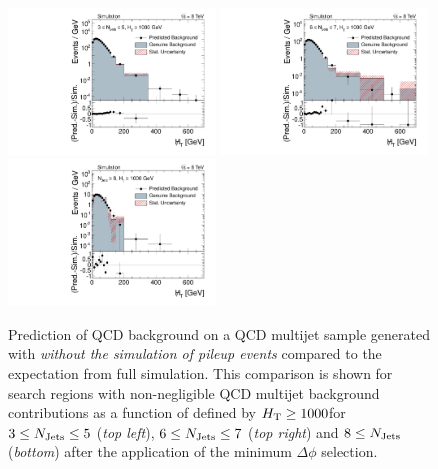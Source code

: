 \begin{figure}[!t]
  \centering

  \begin{minipage}[c]{1.\textwidth}
    \begin{center}
      \includegraphics[width=0.49\textwidth]{figures/MHT_JetBin2_HThigh_pythia_chsJets_pt0_NoPU_v1.pdf}%
      \includegraphics[width=0.49\textwidth]{figures/MHT_JetBin3_HThigh_pythia_chsJets_pt0_NoPU_v1.pdf}\\ 
      \includegraphics[width=0.49\textwidth]{figures/MHT_JetBin4_HThigh_pythia_chsJets_pt0_NoPU_v1.pdf}
    \end{center}
  \end{minipage}
  \caption{Prediction of QCD background on a QCD multijet sample generated with \pythia \textit{without the simulation of pileup events} compared to the expectation from full simulation. This comparison is shown for search regions with non-negligible QCD multijet background contributions as a function of \MHT defined by $H_{\text{T}} \ge 1000$\gev for $3 \le N_{\text{Jets}} \le 5$ (\textit{top left}), $6 \le N_{\text{Jets}} \le 7$ (\textit{top right}) and $8 \le N_{\text{Jets}}$ (\textit{bottom}) after the application of the minimum $\Delta \phi$ selection.}
  \label{fig:qcd_rs_closure_nopu}
\end{figure}
